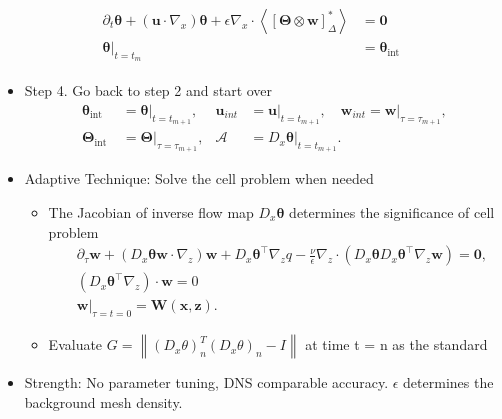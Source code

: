 \documentclass[aspectratio=169]{beamer}
\begin{document}
\begin{frame}[c]
\begin{itemize}
				\begin{align*}
					\begin{aligned}
						\partial_t \boldsymbol{\theta}+\left(\mathbf{u} \cdot \nabla_x\right) \boldsymbol{\theta}+\epsilon \nabla_x \cdot\left\langle[\boldsymbol{\Theta} \otimes \mathbf{w}]_{\Delta}^*\right\rangle&=\mathbf{0} \\
						 \left.\boldsymbol{\theta}\right|_{t=t_m}&=\boldsymbol{\theta}_{\text {int }}
					\end{aligned}
				\end{align*}
	\end{itemize}
\end{frame}
\begin{frame}
	\begin{itemize}
		\item Step 4. Go back to step 2 and start over
		\begin{equation*}
			\begin{aligned}
				\boldsymbol{\theta}_{\text {int }} & =\left.\boldsymbol{\theta}\right|_{t=t_{m+1}}, & \mathbf{u}_{i n t} & =\left.\mathbf{u}\right|_{t=t_{m+1}}, \quad \mathbf{w}_{i n t}=\left.\mathbf{w}\right|_{\tau=\tau_{m+1}}, \\
				\boldsymbol{\Theta}_{\text {int }} & =\left.\boldsymbol{\Theta}\right|_{\tau=\tau_{m+1}}, & \mathcal{A} & =\left.D_x \boldsymbol{\theta}\right|_{t=t_{m+1}} .
			\end{aligned}
		\end{equation*}
		\item Adaptive Technique: Solve the cell problem when needed
		\begin{itemize}
			\item The Jacobian of inverse flow map $D_x \boldsymbol{\theta}$ determines the significance of cell problem
			\begin{equation*}
				\begin{aligned}
					& \partial_\tau \mathbf{w}+\left(D_x \boldsymbol{\theta} \mathbf{w} \cdot \nabla_z\right) \mathbf{w}+D_x \boldsymbol{\theta}^{\top} \nabla_z q-\frac{\nu}{\epsilon} \nabla_z \cdot\left(D_x \boldsymbol{\theta} D_x \boldsymbol{\theta}^{\top} \nabla_z \mathbf{w}\right)=\mathbf{0}, \\
					& \left(D_x \boldsymbol{\theta}^{\top} \nabla_z\right) \cdot \mathbf{w}=0 \\
					& \left.\mathbf{w}\right|_{\tau=t=0}=\mathbf{W}(\mathbf{x}, \mathbf{z}) .
				\end{aligned}
			\end{equation*}
			\item Evaluate $G=\left\|\left(D_x \theta\right)_n^T\left(D_x \theta\right)_n-I\right\|$ at time t = n as the standard
		\end{itemize}
		\item Strength: No parameter tuning, DNS comparable accuracy. $\epsilon$ determines the background mesh density.
	\end{itemize}
\end{frame}
\end{document}
